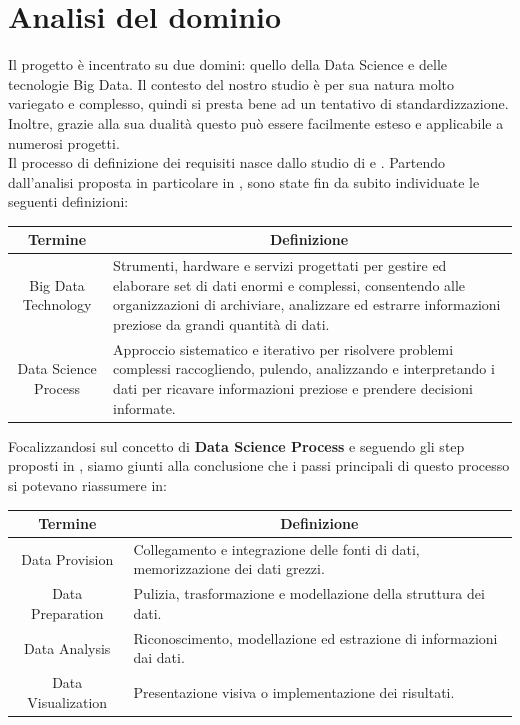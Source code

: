 \section{Analisi del dominio}\label{sec:analisi_dominio}
Il progetto è incentrato su due domini: quello della Data Science e delle tecnologie Big Data. Il contesto del nostro studio è per sua natura molto variegato e complesso, quindi si presta bene ad un tentativo di standardizzazione. Inoltre, grazie alla sua dualità questo può essere facilmente esteso e applicabile a numerosi progetti.\\

Il processo di definizione dei requisiti nasce dallo studio di \cite{BDOnto} e \cite{BDOnto_PhD}. Partendo dall'analisi proposta in particolare in \cite{BDOnto}, sono state fin da subito individuate le seguenti definizioni:
\begin{table}[H] 
\centering 
\begin{tabular}{cp{40ex}} 
\hline {\textbf{Termine}}& \multicolumn{1}{c}{\textbf{Definizione}}\\ 
\hline Big Data Technology &  Strumenti, hardware e servizi progettati per gestire ed elaborare set di dati enormi e complessi, consentendo alle organizzazioni di archiviare, analizzare ed estrarre informazioni preziose da grandi quantità di dati.\\ 
\hline Data Science Process & Approccio sistematico e iterativo per risolvere problemi complessi raccogliendo, pulendo, analizzando e interpretando i dati per ricavare informazioni preziose e prendere decisioni informate.\\ 
\hline 
\end{tabular}
\end{table}
\newpage
Focalizzandosi sul concetto di \textbf{Data Science Process} e seguendo gli step proposti in \cite{BDOnto}, siamo giunti alla conclusione che i passi principali di questo processo si potevano riassumere in:
\begin{table}[H] 
\centering 
\begin{tabular}{cp{40ex}} 
\hline {\textbf{Termine}}& \multicolumn{1}{c}{\textbf{Definizione}}\\ 
\hline Data Provision &  Collegamento e integrazione delle fonti di dati, memorizzazione dei dati grezzi.\\ 
\hline Data Preparation & Pulizia, trasformazione e modellazione della struttura dei dati.\\ 
\hline Data Analysis & Riconoscimento, modellazione ed estrazione di informazioni dai dati.\\ 
\hline Data Visualization & Presentazione visiva o implementazione dei risultati.\\ 
\hline 
\end{tabular}
\end{table}

